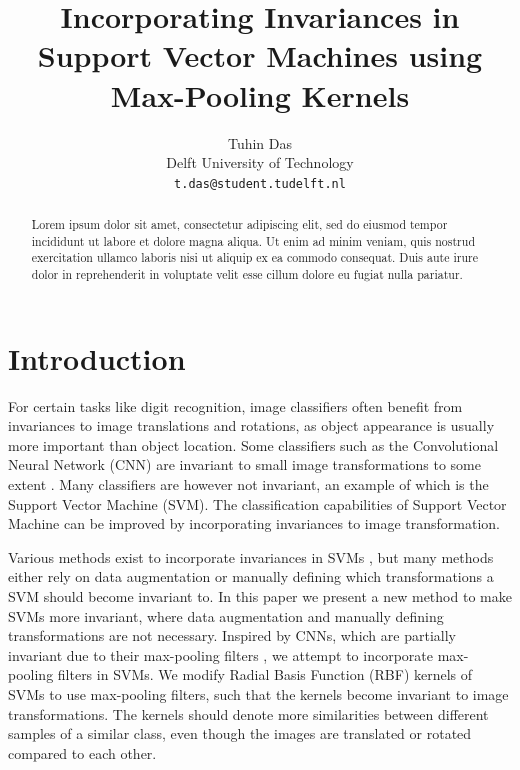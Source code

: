 \documentclass[10pt,twocolumn,letterpaper]{article}
\begin{document}
\title{Incorporating Invariances in Support Vector Machines using Max-Pooling Kernels}

\author{Tuhin Das\\
Delft University of Technology\\
{\tt\small t.das@student.tudelft.nl}
}

\maketitle

\begin{abstract}
\color{lightgray}
   Lorem ipsum dolor sit amet, consectetur adipiscing elit, sed do eiusmod tempor incididunt ut labore et dolore magna aliqua. Ut enim ad minim veniam, quis nostrud exercitation ullamco laboris nisi ut aliquip ex ea commodo consequat. Duis aute irure dolor in reprehenderit in voluptate velit esse cillum dolore eu fugiat nulla pariatur.
\end{abstract}



\section{Introduction}

For certain tasks like digit recognition, image classifiers often benefit from invariances to image translations and rotations, as object appearance is usually more important than object location. 
Some classifiers such as the Convolutional Neural Network (CNN) are invariant to small image transformations to some extent \cite{albawiUnderstandingConvolutionalNeural2017}. 
Many classifiers are however not invariant, an example of which is the Support Vector Machine (SVM). 
The classification capabilities of Support Vector Machine can be improved by incorporating invariances to image transformation. 

Various methods exist to incorporate invariances in SVMs \cite{lauerIncorporatingPriorKnowledge2008}, but many methods either rely on data augmentation or manually defining which transformations a SVM should become invariant to.  
In this paper we present a new method to make SVMs more invariant, where data augmentation and manually defining transformations are not necessary. 
Inspired by CNNs, which are partially invariant due to their max-pooling filters \cite{goodfellowDeepLearning2016, hutchisonEvaluationPoolingOperations2010b}, we attempt to incorporate max-pooling filters in SVMs. 
We modify Radial Basis Function (RBF) kernels of SVMs to use max-pooling filters, such that the kernels become invariant to image transformations.
The kernels should denote more similarities between different samples of a similar class, even though the images are translated or rotated compared to each other.  
\end{document}
